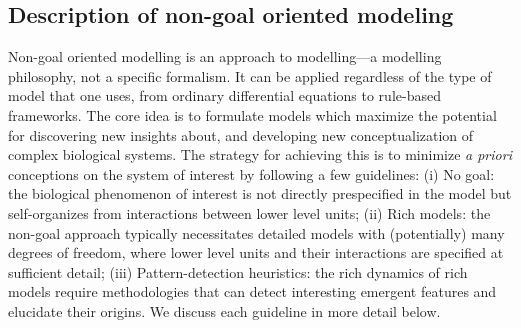 \subsection{Description of non-goal oriented modeling}

Non-goal oriented modelling is an approach to modelling---a modelling philosophy, not a specific formalism. It can be applied regardless of the type of model that one uses, from ordinary differential equations to rule-based frameworks. The core idea is to formulate models which maximize the potential for discovering new insights about, and developing new conceptualization of complex biological systems. The strategy for achieving this is to minimize \emph{a priori} conceptions on the system of interest by following a few guidelines: (i) No goal: the biological phenomenon of interest is not directly prespecified in the model but self-organizes from interactions between lower level units; (ii) Rich models: the non-goal approach typically necessitates detailed models with (potentially) many degrees of freedom, where lower level units and their interactions are specified at sufficient detail; (iii) Pattern-detection heuristics: the rich dynamics of rich models require methodologies that can  detect interesting emergent features and elucidate their origins.  We discuss each guideline in more detail below.
  